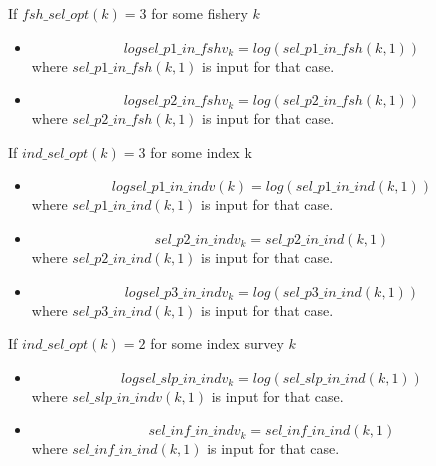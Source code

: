 \documentclass{article}
\begin{document}
If $fsh\_sel\_opt(k)=3$ for some fishery $k$
\begin{itemize}
    \item \begin{equation}
    logsel\_p1\_in\_fshv_k = log(sel\_p1\_in\_fsh(k,1)) 
\end{equation}
where $sel\_p1\_in\_fsh(k,1)$ is input for that case.

\item \begin{equation}
 logsel\_p2\_in\_fshv_k =    log(sel\_p2\_in\_fsh(k,1))   
\end{equation}
where $sel\_p2\_in\_fsh(k,1)$ is input for that case.
\end{itemize}



If $ind\_sel\_opt(k)=3$ for some index k
\begin{itemize}
\item \begin{equation}
    logsel\_p1\_in\_indv(k) = log (sel\_p1\_in\_ind(k,1))
\end{equation} 
where $sel\_p1\_in\_ind(k,1)$ is input for that case.

\item \begin{equation}
sel\_p2\_in\_indv_k = sel\_p2\_in\_ind(k,1)
\end{equation} 
where $sel\_p2\_in\_ind(k,1)$ is input for that case.

\item \begin{equation}
    logsel\_p3\_in\_indv_k = log(sel\_p3\_in\_ind(k,1))
\end{equation}
where $sel\_p3\_in\_ind(k,1)$ is input for that case.

\end{itemize}


If $ind\_sel\_opt(k)=2$ for some index survey $k$
\begin{itemize}
    \item \begin{equation}
    logsel\_slp\_in\_indv_k = log(sel\_slp\_in\_ind(k,1))
\end{equation}
where $sel\_slp\_in\_indv(k,1)$ is input for that case.

\item \begin{equation}
sel\_inf\_in\_indv_k = sel\_inf\_in\_ind(k,1) 
\end{equation}
where $sel\_inf\_in\_ind(k,1)$ is input for that case.
\end{itemize}
\end{document}
